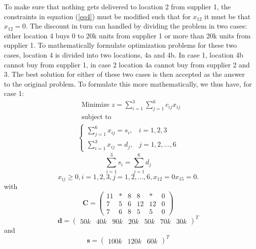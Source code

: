 \documentclass{article}
\begin{document}
  \noindent
  To make sure that nothing gets delivered to location 2 from supplier 1, the
  constraints in equation (\ref{eq4}) must be modified such that for $x_{12}$
  it must be that $x_{12} = 0$. The discount in turn can handled by dividing
  the problem in two cases: either location 4 buys 0 to 20k units from supplier
  1 or more than 20k units from supplier 1. To mathematically formulate
  optimization problems for these two cases, location 4 is divided into two
  locations, 4a and 4b. In case 1, location 4b cannot buy from supplier 1, in
  case 2 location 4a cannot buy from supplier 2 and 3. The best solution for
  either of these two cases is then accepted as the answer to the original
  problem. To formulate this more mathematically, we thus have, for case 1:
  \begin{align*}
  & \text{Minimize } z = \sum_{i=1}^{3}\sum_{j=1}^6 c_{ij}x_{ij} \\
  & \text{subject to}
    \label{eq10}
  \end{align*}
  \begin{align}
    \begin{cases}
      \sum_{j=1}^{6} x_{ij} = s_{i}, & i = 1, 2, 3 \\
      \sum_{i=1}^{3} x_{ij} = d_{j}, & j = 1, 2, ..., 6
    \end{cases}
  \end{align}
  \begin{equation}
    \sum_{i=1}^{3} s_{i} = \sum_{j=1}^6 d_{j}
    \label{eq12}
  \end{equation}
  \begin{equation}
    x_{ij} \geq 0, i = 1, 2, 3, j = 1, 2, ..., 6, x_{12} = 0 x_{15} = 0.
    \label{eq13}
  \end{equation}
  with
  \begin{equation}
    \mathbf{C} =
    \begin{pmatrix}
      11 & * & 8 & 8  & *  & 0\\
      7  & 5 & 6 & 12 & 12 & 0\\
      7  & 6 & 8 & 5  & 5  & 0
    \end{pmatrix}
    \label{eq14}
  \end{equation}
  \begin{equation}
    \mathbf{d} =
    \begin{pmatrix}
      50k & 40k & 90k & 20k & 50k & 70k & 30k
    \end{pmatrix}^T
    \label{eq15}
  \end{equation}
  and
  \begin{equation}
    \mathbf{s} =
    \begin{pmatrix}
      100k & 120k & 60k
    \end{pmatrix}^T
    \label{eq16}
  \end{equation}
\end{document}
